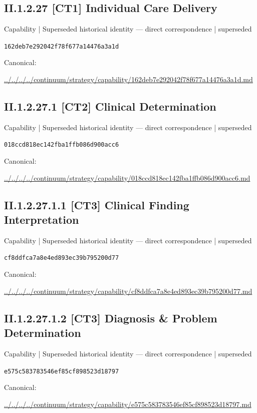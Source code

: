\documentclass[10pt,a4paper]{article}
\begin{document}
\subsection*{II.1.2.27 [CT1] Individual Care Delivery}
{\small Capability | Superseded historical identity — direct correspondence | superseded}\par
\texttt{162deb7e292042f78f677a14476a3a1d}\par
Canonical: \par
{\footnotesize\url{../../../../continuum/strategy/capability/162deb7e292042f78f677a14476a3a1d.md}}\par
\subsection*{II.1.2.27.1 [CT2] Clinical Determination}
{\small Capability | Superseded historical identity — direct correspondence | superseded}\par
\texttt{018ccd818ec142fba1ffb086d900acc6}\par
Canonical: \par
{\footnotesize\url{../../../../continuum/strategy/capability/018ccd818ec142fba1ffb086d900acc6.md}}\par
\subsection*{II.1.2.27.1.1 [CT3] Clinical Finding Interpretation}
{\small Capability | Superseded historical identity — direct correspondence | superseded}\par
\texttt{cf8ddfca7a8e4ed893ec39b795200d77}\par
Canonical: \par
{\footnotesize\url{../../../../continuum/strategy/capability/cf8ddfca7a8e4ed893ec39b795200d77.md}}\par
\subsection*{II.1.2.27.1.2 [CT3] Diagnosis \& Problem Determination}
{\small Capability | Superseded historical identity — direct correspondence | superseded}\par
\texttt{e575c583783546ef85cf898523d18797}\par
Canonical: \par
{\footnotesize\url{../../../../continuum/strategy/capability/e575c583783546ef85cf898523d18797.md}}\par
\end{document}
